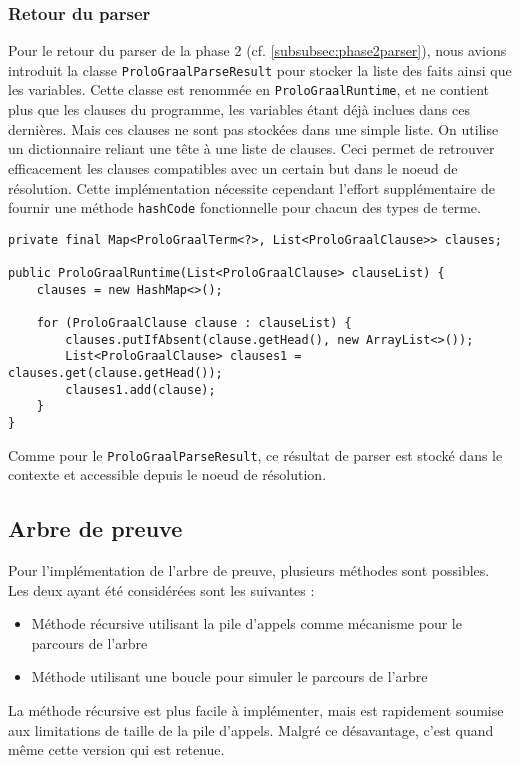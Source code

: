 \documentclass[../report.tex]{subfiles}
\begin{document}
\subsubsection{Retour du parser}
Pour le retour du parser de la phase 2 (cf. \ref{subsubsec:phase2parser}), nous avions introduit la classe \texttt{ProloGraalParseResult} pour stocker la liste des faits ainsi que les variables. Cette classe est renommée en \texttt{ProloGraalRuntime}, et ne contient plus que les clauses du programme, les variables étant déjà inclues dans ces dernières. Mais ces clauses ne sont pas stockées dans une simple liste. On utilise un dictionnaire reliant une tête à une liste de clauses. Ceci permet de retrouver efficacement les clauses compatibles avec un certain but dans le noeud de résolution. Cette implémentation nécessite cependant l'effort supplémentaire de fournir une méthode \texttt{hashCode} fonctionnelle pour chacun des types de terme.
\begin{verbatim}
private final Map<ProloGraalTerm<?>, List<ProloGraalClause>> clauses;

public ProloGraalRuntime(List<ProloGraalClause> clauseList) {
    clauses = new HashMap<>();

    for (ProloGraalClause clause : clauseList) {
        clauses.putIfAbsent(clause.getHead(), new ArrayList<>());
        List<ProloGraalClause> clauses1 = clauses.get(clause.getHead());
        clauses1.add(clause);
    }
}
\end{verbatim}
Comme pour le \texttt{ProloGraalParseResult}, ce résultat de parser est stocké dans le contexte et accessible depuis le noeud de résolution.
\subsection{Arbre de preuve}
Pour l'implémentation de l'arbre de preuve, plusieurs méthodes sont possibles. Les deux ayant été considérées sont les suivantes :
\begin{itemize}
    \item Méthode récursive utilisant la pile d'appels comme mécanisme pour le parcours de l'arbre
    \item Méthode utilisant une boucle pour simuler le parcours de l'arbre
\end{itemize}
La méthode récursive est plus facile à implémenter, mais est rapidement soumise aux limitations de taille de la pile d'appels. Malgré ce désavantage, c'est quand même cette version qui est retenue.
\end{document}
